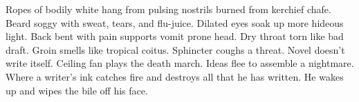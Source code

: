 \documentclass{article}
\begin{document}
\newline

Ropes of bodily white hang from pulsing nostrils burned from kerchief
chafe. Beard soggy with sweat, tears, and flu-juice. Dilated eyes soak
up more hideous light. Back bent with pain supports vomit prone head.
Dry throat torn like bad draft. Groin smells like tropical coitus.
Sphincter coughs a threat. Novel doesn't write itself. Ceiling fan plays
the death march. Ideas flee to assemble a nightmare. Where a writer's
ink catches fire and destroys all that he has written. He wakes up and
wipes the bile off his face.
\end{document}
